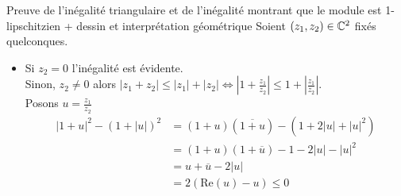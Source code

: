 \documentclass{article}
\renewenvironment{question_kholle}[2][ ]
{
	\subsection{\texorpdfstring{#2}{}}
	\notblank{#1}
	{
		\noindent #1
		\bigbreak
	}
	{}
	\begin{proof}
}
{
	\end{proof}
}
\begin{document}
\allowdisplaybreaks[4]
\begin{question_kholle}
	{Preuve de l'inégalité triangulaire et de l'inégalité montrant que le module est 1-lipschitzien + dessin et interprétation géométrique}
	Soient $(z_1,z_2) \in \mathbb C^2$ fixés quelconques.
	\begin{itemize}[label=$\lozenge$]
		\item

		      Si $z_{2} = 0$ l'inégalité est évidente.\\
		      Sinon, $z_{2} \neq 0$ alors $\lvert z_{1}+z_{2} \rvert \leqslant \lvert z_{1} \rvert + \lvert z_{2} \rvert \iff \left| 1+\frac{z_{1}}{z_{2}} \right|\leqslant 1 + \left\lvert  \frac{z_{1}}{z_{2}}  \right\rvert$.\\
		      Posons $u = \frac{z_{1}}{z_{2}}$
		      \begin{align*}
			      \lvert 1+u \rvert ^{2} - (1+\lvert u \rvert )^{2} & = (1+u)(\overline{1+u})-(1+2\lvert u \rvert +\lvert u \rvert ^{2})     \\
			                                                        & = (1+u)(1+ \overline u) - 1 - 2\lvert u \rvert  - \lvert u \rvert ^{2} \\
			                                                        & = u + \overline u -2 \lvert u \rvert                                   \\
			                                                        & = 2(\mathrm{Re}(u)-u) \leqslant 0
		      \end{align*}


\end{itemize}
\end{question_kholle}
\end{document}
